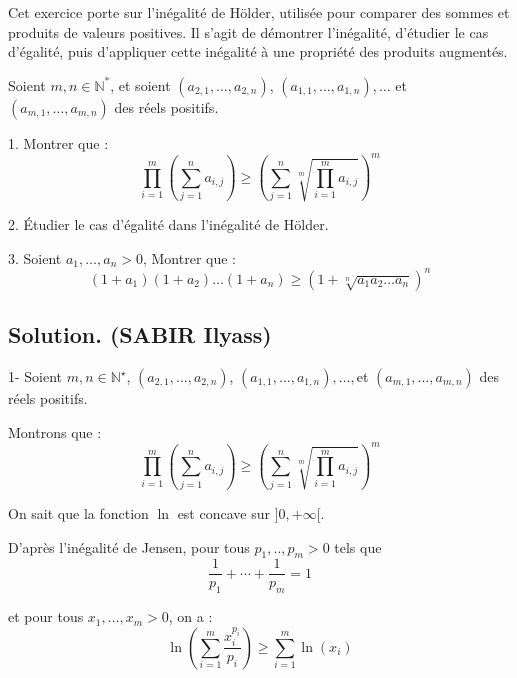 Cet exercice porte sur l'in{\'e}galit{\'e} de H{\"o}lder, utilis{\'e}e pour comparer des sommes et produits de valeurs positives. Il s'agit de d{\'e}montrer l'in{\'e}galit{\'e}, d'{\'e}tudier le cas d'{\'e}galit{\'e}, puis d'appliquer cette in{\'e}galit{\'e} {\`a} une propri{\'e}t{\'e} des produits augment{\'e}s.
\begin{exercise}
Soient ${m, n \in \mathbb{N}^{\ast}} $, et soient $(a_{2, 1}, \ldots, a_{2,
n})$, $(a_{1, 1}, \ldots, a_{1, n}), \ldots$ et $(a_{m, 1}, \ldots, a_{m, n})$
des r{\'e}els positifs.

1. Montrer que :
\[ \underset{i = 1}{\overset{m}{\prod}} \left( \overset{n}{\underset{j =
   1}{\sum}} a_{i, j} \right) \geqslant \left( \underset{j =
   1}{\overset{n}{\sum}} \sqrt[m]{\underset{i = 1}{\overset{m}{\prod}} a_{i,
   j}} \right)^m \]


2. {\'E}tudier le cas d'{\'e}galit{\'e} dans l'in{\'e}galit{\'e} de
H{\"o}lder.

3. Soient $a_1, \ldots, a_n > 0$, Montrer que :
\[ (1 + a_1) (1 + a_2) \ldots (1 + a_n) \geqslant \left( 1 + \sqrt[n]{a_1 a_2
   \ldots a_n} \right)^n \]
\end{exercise}

\subsection*{Solution. (SABIR Ilyass)}


1- Soient $m, n \in \mathbb{N}^{\star}$, $(a_{2, 1}, \ldots, a_{2, n})$,
$(a_{1, 1}, \ldots, a_{1, n}), \ldots,$et $(a_{m, 1}, \ldots, a_{m, n})$ des
r{\'e}els positifs.

Montrons que :
\[ \underset{i = 1}{\overset{m}{\prod}} \left( \overset{n}{\underset{j =
   1}{\sum}} a_{i, j} \right) \geqslant \left( \underset{j =
   1}{\overset{n}{\sum}} \sqrt[m]{\underset{i = 1}{\overset{m}{\prod}} a_{i,
   j}} \right)^m \]


On sait que la fonction $\ln$ est concave sur $] 0, + \infty [$.

D'apr{\`e}s l'in{\'e}galit{\'e} de Jensen, pour tous $p_1, .., p_m > 0$ tels
que
\[ \frac{1}{p_1} + \cdots + \frac{1}{p_m} = 1 \]


et pour tous $x_1, \ldots, x_m > 0$, on a :
\[ \ln \left( \underset{i = 1}{\overset{}{} \overset{m}{\sum}}
   \frac{x^{p_i}_i}{p_i} \right) \geqslant \underset{i = 1}{\overset{}{}
   \overset{m}{\sum}} \ln (x_i) \]


